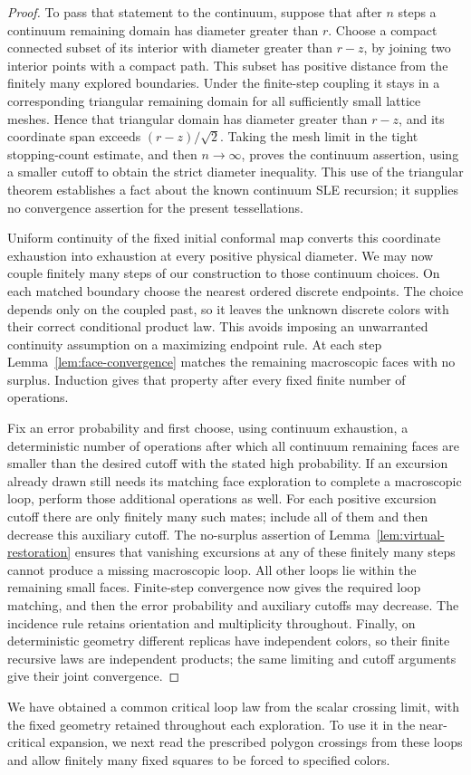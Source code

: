 \begin{proof}
To pass that statement to the continuum, suppose that after
$n$ steps a continuum remaining domain has diameter greater
than $r$.  Choose a compact connected subset of its interior
with diameter greater than $r-z$, by joining two interior
points with a compact path.  This subset has positive distance
from the finitely many explored boundaries.  Under the
finite-step coupling it stays in a corresponding triangular
remaining domain for all sufficiently small lattice meshes.
Hence that triangular domain has diameter greater than
$r-z$, and its coordinate span exceeds
$(r-z)/\sqrt{2}$.  Taking the mesh limit in the tight
stopping-count estimate, and then $n\to\infty$, proves the
continuum assertion, using a smaller cutoff to obtain the
strict diameter inequality.  This use of the triangular theorem
establishes a fact about the known continuum SLE recursion;
it supplies no convergence assertion for the present
tessellations.

Uniform continuity of the fixed initial conformal map converts
this coordinate exhaustion into exhaustion at every positive
physical diameter.  We may now couple finitely many steps of our construction
to those continuum choices.  On each matched boundary choose
the nearest ordered discrete endpoints.  The choice depends
only on the coupled past, so it leaves the unknown discrete
colors with their correct conditional product law.  This
avoids imposing an unwarranted continuity assumption on a
maximizing endpoint rule.  At each step
Lemma~\ref{lem:face-convergence} matches the remaining
macroscopic faces with no surplus.  Induction gives that
property after every fixed finite number of operations.

Fix an error probability and first choose, using continuum
exhaustion, a deterministic number of operations after which
all continuum remaining faces are smaller than the desired
cutoff with the stated high probability.  If an excursion
already drawn still needs its matching face exploration to
complete a macroscopic loop, perform those additional
operations as well.  For each positive excursion cutoff
there are only finitely many such mates; include all of
them and then decrease this auxiliary cutoff.  The
no-surplus assertion of Lemma~\ref{lem:virtual-restoration}
ensures that vanishing excursions at any of these finitely
many steps cannot produce a missing macroscopic loop.
All other loops lie within the remaining small faces.
Finite-step convergence now gives the required loop matching,
and then the error probability and auxiliary cutoffs may
decrease.  The incidence rule retains orientation and
multiplicity throughout.  Finally, on deterministic geometry
different replicas have independent colors, so their finite
recursive laws are independent products; the same limiting
and cutoff arguments give their joint convergence.
\end{proof}

We have obtained a common critical loop law from the scalar
crossing limit, with the fixed geometry retained throughout
each exploration.  To use it in the near-critical expansion,
we next read the prescribed polygon crossings from these
loops and allow finitely many fixed squares to be forced to
specified colors.
